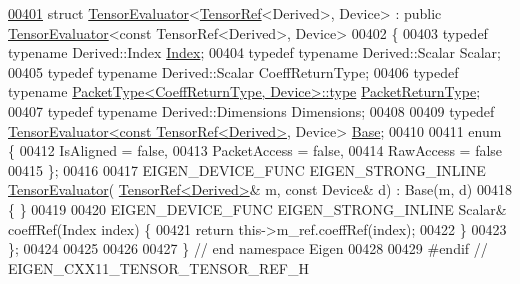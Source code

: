 \begin{DoxyCode}
\hyperlink{struct_eigen_1_1_tensor_evaluator_3_01_tensor_ref_3_01_derived_01_4_00_01_device_01_4}{00401} \textcolor{keyword}{struct }\hyperlink{struct_eigen_1_1_tensor_evaluator}{TensorEvaluator}<\hyperlink{class_eigen_1_1_tensor_ref}{TensorRef}<Derived>, Device> : \textcolor{keyword}{public} 
      \hyperlink{struct_eigen_1_1_tensor_evaluator}{TensorEvaluator}<const TensorRef<Derived>, Device>
00402 \{
00403   \textcolor{keyword}{typedef} \textcolor{keyword}{typename} Derived::Index \hyperlink{namespace_eigen_a62e77e0933482dafde8fe197d9a2cfde}{Index};
00404   \textcolor{keyword}{typedef} \textcolor{keyword}{typename} Derived::Scalar Scalar;
00405   \textcolor{keyword}{typedef} \textcolor{keyword}{typename} Derived::Scalar CoeffReturnType;
00406   \textcolor{keyword}{typedef} \textcolor{keyword}{typename} \hyperlink{group___sparse_core___module}{PacketType<CoeffReturnType, Device>::type} 
      \hyperlink{group___sparse_core___module}{PacketReturnType};
00407   \textcolor{keyword}{typedef} \textcolor{keyword}{typename} Derived::Dimensions Dimensions;
00408 
00409   \textcolor{keyword}{typedef} \hyperlink{struct_eigen_1_1_tensor_evaluator}{TensorEvaluator<const TensorRef<Derived>}, Device> 
      \hyperlink{struct_eigen_1_1_tensor_evaluator_3_01const_01_tensor_ref_3_01_derived_01_4_00_01_device_01_4}{Base};
00410 
00411   \textcolor{keyword}{enum} \{
00412     IsAligned = \textcolor{keyword}{false},
00413     PacketAccess = \textcolor{keyword}{false},
00414     RawAccess = \textcolor{keyword}{false}
00415   \};
00416 
00417   EIGEN\_DEVICE\_FUNC EIGEN\_STRONG\_INLINE \hyperlink{struct_eigen_1_1_tensor_evaluator}{TensorEvaluator}(
      \hyperlink{class_eigen_1_1_tensor_ref}{TensorRef<Derived>}& m, \textcolor{keyword}{const} Device& d) : Base(m, d)
00418   \{ \}
00419 
00420   EIGEN\_DEVICE\_FUNC EIGEN\_STRONG\_INLINE Scalar& coeffRef(Index index) \{
00421     \textcolor{keywordflow}{return} this->m\_ref.coeffRef(index);
00422   \}
00423 \};
00424 
00425 
00426 
00427 \} \textcolor{comment}{// end namespace Eigen}
00428 
00429 \textcolor{preprocessor}{#endif // EIGEN\_CXX11\_TENSOR\_TENSOR\_REF\_H}
\end{DoxyCode}
